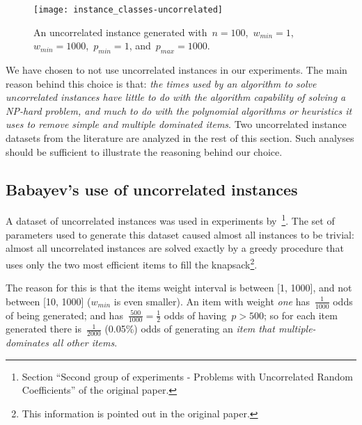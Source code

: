 \begin{figure}[h]
\caption{An uncorrelated instance generated with~\(n = 100\),~\(w_{min} = 1\),~\(w_{min} = 1000\),~\(p_{min} = 1\), and~\(p_{max} = 1000\).}
\begin{center}
\texttt{[image: instance\_classes-uncorrelated]}
\end{center}
\label{fig:uncorrelated_example}
\end{figure}

We have chosen to not use uncorrelated instances in our experiments.
The main reason behind this choice is that: \emph{the times used by an algorithm to solve uncorrelated instances have little to do with the algorithm capability of solving a NP-hard problem, and much to do with the polynomial algorithms or heuristics it uses to remove simple and multiple dominated items}.
Two uncorrelated instance datasets from the literature are analyzed in the rest of this section.
Such analyses should be sufficient to illustrate the reasoning behind our choice.

\subsection{Babayev's use of uncorrelated instances}
\label{sec:babayev_uncorrelated}

A dataset of uncorrelated instances was used in experiments by~\cite{babayev}\footnote{Section ``Second group of experiments - Problems with Uncorrelated Random Coefficients'' of the original paper.}.
The set of parameters used to generate this dataset caused almost all instances to be trivial: almost all uncorrelated instances are solved exactly by a greedy procedure that uses only the two most efficient items to fill the knapsack\footnote{This information is pointed out in the original paper.}.

The reason for this is that the items weight interval is between [1, 1000], and not between [10, 1000] (\(w_{min}\) is even smaller).
An item with weight \emph{one} has~\(\frac{1}{1000}\) odds of being generated; and has~\(\frac{500}{1000} = \frac{1}{2}\) odds of having~\(p > 500\); so for each item generated there is~\(\frac{1}{2000}\) (0.05\%) odds of generating an \emph{item that multiple-dominates all other items}.

